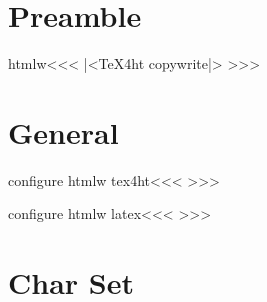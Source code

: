 


\ifx \HTML\UnDef
   \def\HTML{htmlw}                   
   \def\CONFIG{\jobname}
   \def\MAKETITLE{\author{Eitan M. Gurari}}         
   \def\next{  \endinput}
   \expandafter\next
\fi




\section{Preamble}

\<htmlw\><<<
|<TeX4ht copywrite|>
>>>



\section{General}

\<configure htmlw tex4ht\><<<
>>>

\<configure htmlw latex\><<<
>>>

\section{Char Set}



